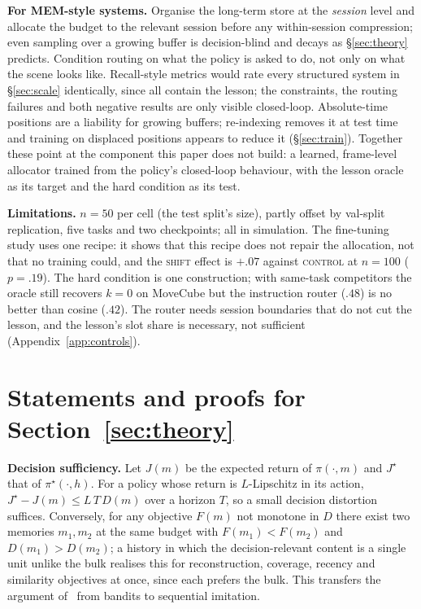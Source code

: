 \documentclass{article}
\newcommand{\sys}[1]{\textsc{#1}}
\begin{document}
\textbf{For MEM-style systems.} Organise the long-term store at the \emph{session} level and allocate the budget to the relevant session before any within-session compression; even sampling over a growing buffer is decision-blind and decays as \S\ref{sec:theory} predicts. Condition routing on what the policy is asked to do, not only on what the scene looks like. Recall-style metrics would rate every structured system in \S\ref{sec:scale} identically, since all contain the lesson; the constraints, the routing failures and both negative results are only visible closed-loop. Absolute-time positions are a liability for growing buffers; re-indexing removes it at test time and training on displaced positions appears to reduce it (\S\ref{sec:train}). Together these point at the component this paper does not build: a learned, frame-level allocator trained from the policy's closed-loop behaviour, with the lesson oracle as its target and the hard condition as its test.

\textbf{Limitations.} $n=50$ per cell (the test split's size), partly offset by val-split replication, five tasks and two checkpoints; all in simulation. The fine-tuning study uses one recipe: it shows that this recipe does not repair the allocation, not that no training could, and the \sys{shift} effect is $+.07$ against \sys{control} at $n{=}100$ ($p=.19$). The hard condition is one construction; with same-task competitors the oracle still recovers $k{=}0$ on MoveCube but the instruction router ($.48$) is no better than cosine ($.42$). The router needs session boundaries that do not cut the lesson, and the lesson's slot share is necessary, not sufficient (Appendix~\ref{app:controls}).

\clearpage
{}



\clearpage
\appendix
\section{Statements and proofs for Section~\ref{sec:theory}}
\label{app:theory}

\textbf{Decision sufficiency.} Let $J(m)$ be the expected return of $\pi(\cdot,m)$ and $J^\star$ that of $\pi^\star(\cdot,h)$. For a policy whose return is $L$-Lipschitz in its action, $J^\star - J(m)\le L\,T\,D(m)$ over a horizon $T$, so a small decision distortion suffices. Conversely, for any objective $F(m)$ not monotone in $D$ there exist two memories $m_1,m_2$ at the same budget with $F(m_1)<F(m_2)$ and $D(m_1)>D(m_2)$; a history in which the decision-relevant content is a single unit unlike the bulk realises this for reconstruction, coverage, recency and similarity objectives at once, since each prefers the bulk. This transfers the argument of~\cite{demem} from bandits to sequential imitation.
\end{document}
